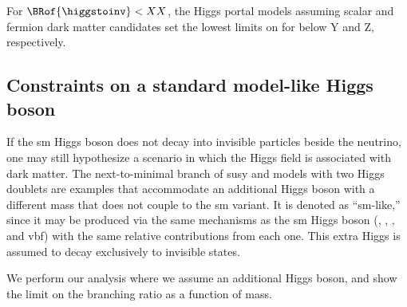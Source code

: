 For $\BRof{\higgstoinv} < XX$, the Higgs portal models assuming scalar and fermion dark matter candidates set the lowest limits on \xsecSI for \mqdark below Y and Z\GeV, respectively.






\subsection{Constraints on a standard model-like Higgs boson}
\label{subsec:htoinv_dark_matter_bsm_higgs}

If the \acrshort{sm} Higgs boson does not decay into invisible particles beside the neutrino, one may still hypothesize a scenario in which the Higgs field is associated with dark matter. The next-to-minimal branch of \acrlong{susy} and models with two Higgs doublets are examples that accommodate an additional Higgs boson with a different mass that does not couple to the \acrshort{sm} variant. It is denoted as ``\acrlong{sm}-like,'' since it may be produced via the same mechanisms as the \acrshort{sm} Higgs boson (\ttH, \VH, \ggH, and \acrshort{vbf}) with the same relative contributions from each one. This extra Higgs is assumed to decay exclusively to invisible states.

We perform our analysis where we assume an additional Higgs boson, and show the limit on the branching ratio as a function of mass.

